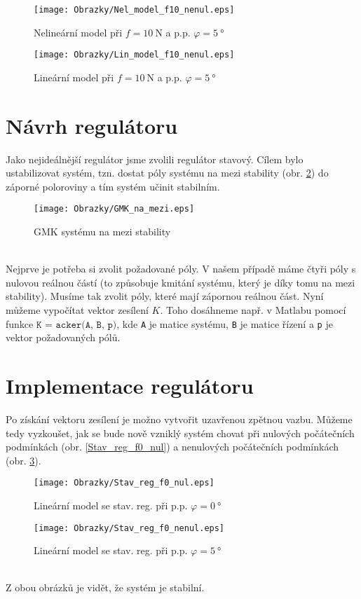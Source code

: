 \documentclass[a4paper, 12pt]{article}
\begin{document}
			\begin{figure}[h]
				\begin{center}
					\texttt{[image: Obrazky/Nel\_model\_f10\_nenul.eps]}
					\label{Nel_model_f10_nenul}
					\caption{Nelineární model při $f=\SI{10}{\newton}$ a p.p. $\varphi = \SI{5}{\degree}$}
				\end{center}
				\begin{center}
					\texttt{[image: Obrazky/Lin\_model\_f10\_nenul.eps]}
					\label{Lin_model_f10_nenul}
					\caption{Lineární model při $f=\SI{10}{\newton}$ a p.p. $\varphi = \SI{5}{\degree}$}
				\end{center}
			\end{figure}
	\clearpage
	\section{Návrh regulátoru}
		Jako nejideálnější regulátor jsme zvolili regulátor stavový. Cílem bylo ustabilizovat systém, tzn. dostat póly systému na mezi stability (obr. \ref{GMK_na_mezi}) do záporné poloroviny a tím systém učinit stabilním.	
		\begin{figure}[h]
			\begin{center}
				\texttt{[image: Obrazky/GMK\_na\_mezi.eps]}
				\label{GMK_na_mezi}
				\caption{GMK systému na mezi stability}
			\end{center}
		\end{figure}
		\\Nejprve je potřeba si zvolit požadované póly. V našem případě máme čtyři póly s nulovou reálnou částí (to způsobuje kmitání systému, který je díky tomu na mezi stability). Musíme tak zvolit póly, které mají zápornou reálnou část. Nyní můžeme vypočítat vektor zesílení $K$. Toho dosáhneme např. v Matlabu pomocí funkce $\texttt{K = acker(A, B, p)}$, kde \texttt{A} je matice systému, \texttt{B} je matice řízení a \texttt{p} je vektor požadovaných pólů. 
	\section{Implementace regulátoru}
		Po získání vektoru zesílení je možno vytvořit uzavřenou zpětnou vazbu. Můžeme tedy vyzkoušet, jak se bude nově vzniklý systém chovat při nulových počátečních podmínkách (obr. \ref{Stav_reg_f0_nul}) a nenulových počátečních podmínkách (obr. \ref{Stav_reg_f0_nenul}).
		\begin{figure}[h]
			\begin{center}
				\texttt{[image: Obrazky/Stav\_reg\_f0\_nul.eps]}
				\label{Stav_reg_f0_nul}
				\caption{Lineární model se stav. reg. při p.p. $\varphi = \SI{0}{\degree}$}
			\end{center}
			\begin{center}
				\texttt{[image: Obrazky/Stav\_reg\_f0\_nenul.eps]}
				\label{Stav_reg_f0_nenul}
				\caption{Lineární model se stav. reg. při p.p. $\varphi = \SI{5}{\degree}$}
			\end{center}
		\end{figure}
		\\Z obou obrázků je vidět, že systém je stabilní.
		\clearpage
\end{document}
